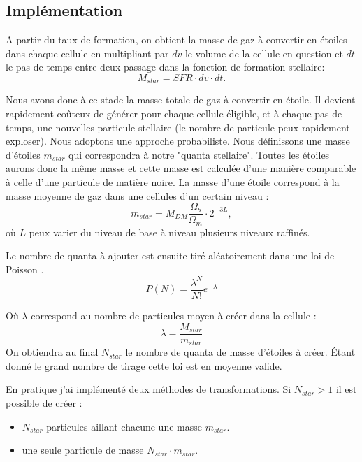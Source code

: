 \subsection{Implémentation}

A partir du taux de formation, on obtient la masse de gaz à convertir en étoiles dans chaque cellule en multipliant par $dv$ le volume de la cellule en question et $dt$ le pas de temps entre deux passage dans la fonction de formation stellaire:
\begin{equation}
	M_{star} = SFR \cdot dv \cdot dt .
\end{equation}

Nous avons donc à ce stade la masse totale de gaz à convertir en étoile.
Il devient rapidement coûteux de générer pour chaque cellule éligible, et à chaque pas de temps, une nouvelles particule stellaire (le nombre de particule peux rapidement exploser).
Nous adoptons une approche probabiliste.
Nous définissons une masse d'étoiles $m_{star}$ qui correspondra à notre "quanta stellaire".
Toutes les étoiles aurons donc la même masse et cette masse est calculée d'une manière comparable à celle d'une particule de matière noire.
La masse d'une étoile correspond à la masse moyenne de gaz dans une cellules d'un certain niveau :
\begin{equation}
 m_{star} = M_{DM} \frac{\Omega_b}{\Omega_m}\cdot 2^{-3L},
\end{equation}
où $L$ peux varier du niveau de base à niveau plusieurs niveaux raffinés.

Le nombre de quanta à ajouter est ensuite tiré aléatoirement dans une loi de Poisson \citep{rasera_history_2006}.
\begin{equation}
	P(N) = \frac{\lambda^N}{N!} e^{-\lambda}
\end{equation}

Où $\lambda$ correspond au nombre de particules moyen à créer dans la cellule :
\begin{equation}
\lambda = \frac{ M_{star}}{m_{star}}
\end{equation}
On obtiendra au final $N_{star}$ le nombre de quanta de masse d'étoiles à créer.
Étant donné le grand nombre de tirage cette loi est en moyenne valide.

En pratique j'ai implémenté deux méthodes de transformations.
Si  $N_{star}>1$ il est possible de créer : 
\begin{itemize}
\item  $N_{star}$ particules aillant chacune une masse  $m_{star}$.
\item une seule particule de masse  $N_{star} \cdot m_{star}$.
\end{itemize}

